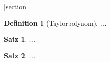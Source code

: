 [section]
\newtheorem{defi}{Definition}[zsaetze]
\newtheorem{satz}{Satz}[zsaetze]

\begin{defi}[Taylorpolynom] ... \end{defi}
\begin{satz} ... \end{satz}
\begin{satz} ... \end{satz}
